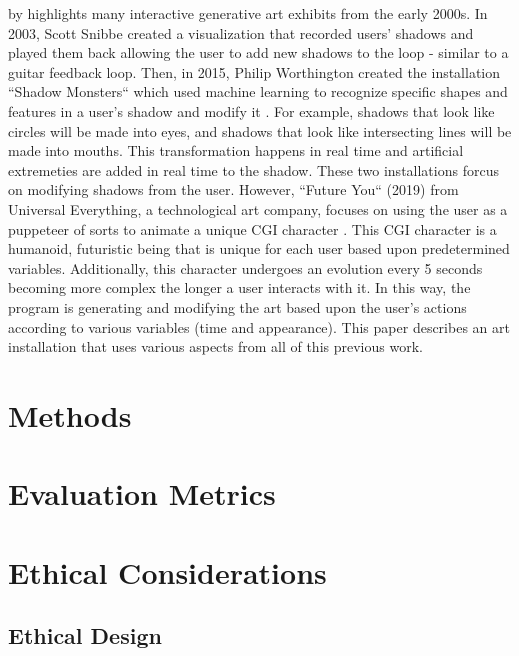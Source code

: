 \documentclass[10pt,twocolumn]{article}
\begin{document}
 by \citeauthor{kwon_real-time_nodate} highlights many interactive generative art exhibits from the early 2000s. In 2003, Scott Snibbe created a visualization that recorded users' shadows and played them back allowing the user to add new shadows to the loop - similar to a guitar feedback loop.  Then, in 2015, Philip Worthington created the installation ``Shadow Monsters`` which used machine learning to recognize specific shapes and features in a user's shadow and modify it \cite{houston_public_media_mfah_2015}.  For example, shadows that look like circles will be made into eyes, and shadows that look like intersecting lines will be made into mouths.  This transformation happens in real time and artificial extremeties are added in real time to the shadow. These two installations forcus on modifying shadows from the user. However, ``Future You`` (2019) from Universal Everything, a technological art company, focuses on using the user as a puppeteer of sorts to animate a unique CGI character \cite{noauthor_future_2019}. This CGI character is a humanoid, futuristic being that is unique for each user based upon predetermined variables. Additionally, this character undergoes an evolution every 5 seconds becoming more complex the longer a user interacts with it.  In this way, the program is generating and modifying the art based upon the user's actions according to various variables (time and appearance).  This paper describes an art installation that uses various aspects from all of this previous work. 


\section{Methods}

\section{Evaluation Metrics}

\section{Ethical Considerations}

\subsection{Ethical Design}\label{sec:design}
\end{document}
